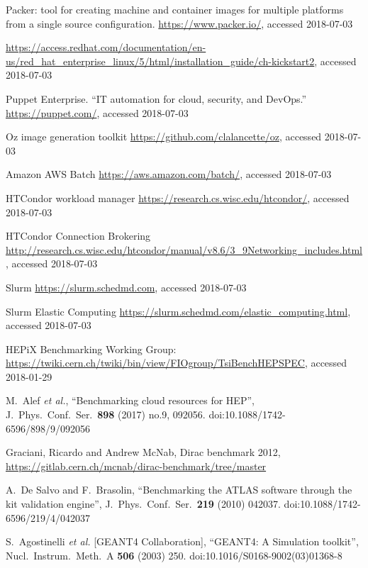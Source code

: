 \begin{thebibliography}{}
Packer: tool for creating machine and container images for multiple platforms from a single source configuration. 
\url{https://www.packer.io/}, accessed 2018-07-03

\url{https://access.redhat.com/documentation/en-us/red_hat_enterprise_linux/5/html/installation_guide/ch-kickstart2}, accessed 2018-07-03

Puppet Enterprise. ``IT automation for cloud, security, and DevOps.''
\url{https://puppet.com/}, accessed 2018-07-03


Oz image generation toolkit
\url{https://github.com/clalancette/oz}, accessed 2018-07-03

Amazon AWS Batch
\url{https://aws.amazon.com/batch/}, accessed 2018-07-03

HTCondor workload manager
\url{https://research.cs.wisc.edu/htcondor/}, accessed 2018-07-03

HTCondor Connection Brokering
\url{http://research.cs.wisc.edu/htcondor/manual/v8.6/3_9Networking_includes.html}, accessed 2018-07-03

  Slurm
  \url{https://slurm.schedmd.com}, accessed 2018-07-03
    
Slurm Elastic Computing
\url{https://slurm.schedmd.com/elastic_computing.html}, accessed 2018-07-03


 HEPiX Benchmarking Working Group:
\url{https://twiki.cern.ch/twiki/bin/view/FIOgroup/TsiBenchHEPSPEC}, accessed 2018-01-29


M.~Alef {\it et al.},
``Benchmarking cloud resources for HEP'',
J.\ Phys.\ Conf.\ Ser.\  {\bf 898} (2017) no.9,  092056.
doi:10.1088/1742-6596/898/9/092056

Graciani, Ricardo and Andrew McNab, Dirac benchmark 2012, 
\url{https://gitlab.cern.ch/mcnab/dirac-benchmark/tree/master}

A.~De Salvo and F.~Brasolin,
``Benchmarking the ATLAS software through the kit validation engine'',
J.\ Phys.\ Conf.\ Ser.\  {\bf 219} (2010) 042037.
doi:10.1088/1742-6596/219/4/042037

S.~Agostinelli {\it et al.} [GEANT4 Collaboration],        
``GEANT4: A Simulation toolkit'',                          
Nucl.\ Instrum.\ Meth.\ A {\bf 506} (2003) 250.            
doi:10.1016/S0168-9002(03)01368-8                          


\end{thebibliography}
